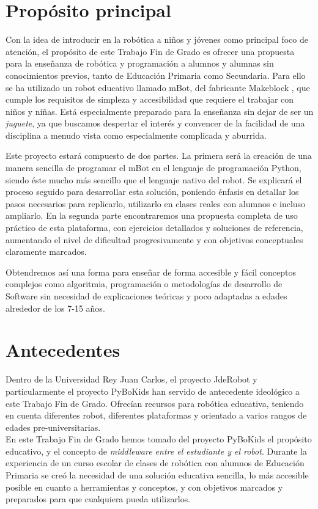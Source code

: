 \section{Propósito principal}
Con la idea de introducir en la robótica a niños y jóvenes como principal foco de atención, el propósito de este Trabajo Fin de Grado es ofrecer una propuesta para la enseñanza de robótica y programación a alumnos y alumnas sin conocimientos previos, tanto de Educación Primaria como Secundaria. Para ello se ha utilizado un robot educativo llamado mBot, del fabricante Makeblock \cite{makeblock}, que cumple los requisitos de simpleza y accesibilidad que requiere el trabajar con niños y niñas. Está especialmente preparado para la enseñanza sin dejar de ser un \textit{juguete}, ya que buscamos despertar el interés y convencer de la facilidad de una disciplina a menudo vista como especialmente complicada y aburrida.

Este proyecto estará compuesto de dos partes. La primera será la creación de una manera sencilla de programar el mBot en el lenguaje de programación Python, siendo éste mucho más sencillo que el lenguaje nativo del robot. Se explicará el proceso seguido para desarrollar esta solución, poniendo énfasis en detallar los pasos necesarios para replicarlo, utilizarlo en clases reales con alumnos e incluso ampliarlo. En la segunda parte encontraremos una propuesta completa de uso práctico de esta plataforma, con ejercicios detallados y soluciones de referencia, aumentando el nivel de dificultad progresivamente y con objetivos conceptuales claramente marcados.

Obtendremos así una forma para enseñar de forma accesible y fácil conceptos complejos como algoritmia, programación o metodologías de desarrollo de Software sin necesidad de explicaciones teóricas y poco adaptadas a edades alrededor de los 7-15 años.


\section{Antecedentes}\label{sec:antecedentes}

Dentro de la Universidad Rey Juan Carlos, el proyecto JdeRobot y particularmente el proyecto PyBoKids \cite{JdeRobot} han servido de antecedente ideológico a este Trabajo Fin de Grado. Ofrecían recursos para robótica educativa, teniendo en cuenta diferentes robot, diferentes plataformas y orientado a varios rangos de edades pre-universitarias.\\

En este Trabajo Fin de Grado hemos tomado del proyecto PyBoKids el propósito educativo, y el concepto de \textit{middleware entre el estudiante y el robot}. Durante la experiencia de un curso escolar de clases de robótica con alumnos de Educación Primaria se creó la necesidad de una solución educativa sencilla, lo más accesible posible en cuanto a herramientas y conceptos, y con objetivos marcados y preparados para que cualquiera pueda utilizarlos.


